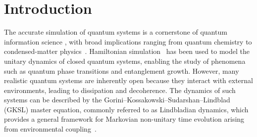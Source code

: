 \documentclass[superscriptaddress,amsmath,amssymb,aps,pra,letterpaper,tightenlines,notitlepages,12pt]{revtex4-2}
\begin{document}
\maketitle

\tableofcontents


\section{Introduction}


The accurate simulation of quantum systems is a cornerstone of quantum information science \cite{breuer2002TheoryOpenQuantum, nielsen2010QuantumComputationQuantum, wiseman2009QuantumMeasurementControl, weiss2012QuantumDissipativeSystems, feynman1982SimulatingPhysicsComputers}, with broad implications ranging from quantum chemistry \cite{wecker2014GatecountEstimatesPerforming, babbush2015ChemicalBasisTrotterSuzuki, reiher2017ElucidatingReactionMechanisms, poulin2014TrotterStepSize} to condensed-matter physics~\cite{raeisi2012QuantumcircuitDesignEfficient, daley2014QuantumTrajectoriesOpen}. Hamiltonian simulation~\cite{low2017OptimalHamiltonianSimulation, berry2015SimulatingHamiltonianDynamics, low2019HamiltonianSimulationQubitization, childs2018FirstQuantumSimulation} has been used to model the unitary dynamics of closed quantum systems, enabling the study of phenomena such as quantum phase transitions and entanglement growth. However, many realistic quantum systems are inherently open because they interact with external environments, leading to dissipation and decoherence. The dynamics of such systems can be described by the Gorini--Kossakowski--Sudarshan--Lindblad (GKSL) master equation, commonly referred to as Lindbladian dynamics, which provides a general framework for Markovian non-unitary time evolution arising from environmental coupling~\cite{breuer2002TheoryOpenQuantum, gorini1976CompletelyPositiveDynamical, lindblad1976GeneratorsQuantumDynamical}.
\end{document}
